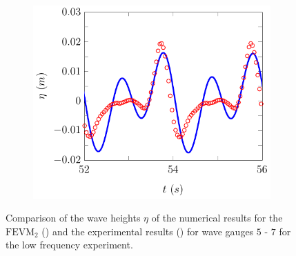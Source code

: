 \begin{figure}
\begin{subfigure}{0.5\textwidth}
	\end{subfigure}
	\begin{subfigure}{0.5\textwidth}
		\includegraphics[width=\textwidth]{./chp6/figures/Experiment/Beji/sl/FEVMWG7.pdf}
		\vspace{0.5cm}
	\end{subfigure}
	\caption{Comparison of the wave heights $\eta$ of the numerical results for the $\text{FEVM}_2$ ({\color{blue}\solidrule}) and the experimental results () for wave gauges $5$ - $7$ for the low frequency experiment.}
	\label{fig:BejislWG5to7FEVM}
\end{figure}


